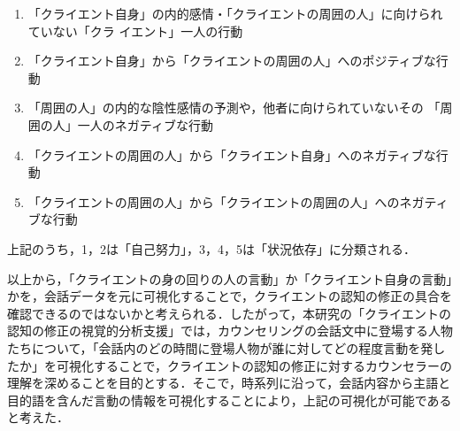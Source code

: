 \documentclass[shuuron]{kuee}
\begin{document}
\begin{enumerate}
  \item 「クライエント自身」の内的感情・「クライエントの周囲の人」に向けられていない「クラ
  イエント」一人の行動
  \item 「クライエント自身」から「クライエントの周囲の人」へのポジティブな行動


  \item 「周囲の人」の内的な陰性感情の予測や，他者に向けられていないその
  「周囲の人」一人のネガティブな行動
  \item 「クライエントの周囲の人」から「クライエント自身」へのネガティブな行動
  \item 「クライエントの周囲の人」から「クライエントの周囲の人」へのネガティブな行動

\end{enumerate}
上記のうち，1，2は「自己努力」，3，4，5は「状況依存」に分類される．

以上から，「クライエントの身の回りの人の言動」か「クライエント自身の言動」かを，会話データを元に可視化することで，クライエントの認知の修正の具合を確認できるのではないかと考えられる．したがって，本研究の「クライエントの認知の修正の視覚的分析支援」では，カウンセリングの会話文中に登場する人物たちについて，「会話内のどの時間に登場人物が誰に対してどの程度言動を発したか」を可視化することで，クライエントの認知の修正に対するカウンセラーの理解を深めることを目的とする．そこで，時系列に沿って，会話内容から主語と目的語を含んだ言動の情報を可視化することにより，上記の可視化が可能であると考えた．






%
%
%
%
\end{document}
